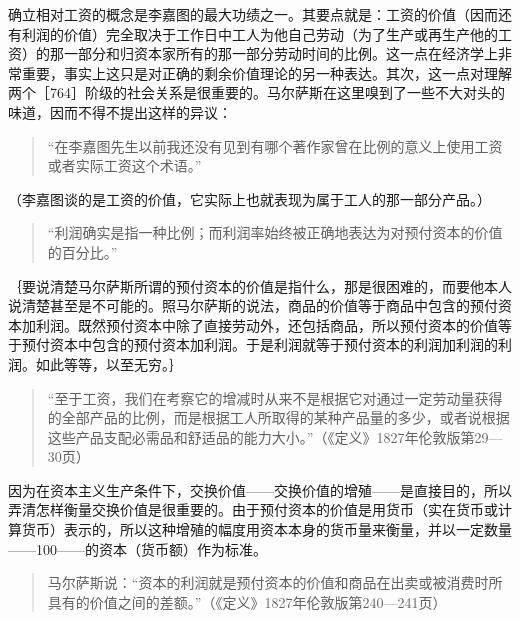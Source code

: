确立相对工资的概念是李嘉图的最大功绩之一。其要点就是：工资的价值（因而还有利润的价值）完全取决于工作日中工人为他自己劳动（为了生产或再生产他的工资）的那一部分和归资本家所有的那一部分劳动时间的比例。这一点在经济学上非常重要，事实上这只是对正确的剩余价值理论的另一种表达。其次，这一点对理解两个［764］阶级的社会关系是很重要的。马尔萨斯在这里嗅到了一些不大对头的味道，因而不得不提出这样的异议：

\begin{quote}{“在李嘉图先生以前我还没有见到有哪个著作家曾在比例的意义上使用工资或者实际工资这个术语。”}\end{quote}

（李嘉图谈的是工资的价值，它实际上也就表现为属于工人的那一部分产品。）

\begin{quote}{“利润确实是指一种比例；而利润率始终被正确地表达为对预付资本的价值的百分比。”}\end{quote}

｛要说清楚马尔萨斯所谓的预付资本的价值是指什么，那是很困难的，而要他本人说清楚甚至是不可能的。照马尔萨斯的说法，商品的价值等于商品中包含的预付资本加利润。既然预付资本中除了直接劳动外，还包括商品，所以预付资本的价值等于预付资本中包含的预付资本加利润。于是利润就等于预付资本的利润加利润的利润。如此等等，以至无穷。｝

\begin{quote}{“至于工资，我们在考察它的增减时从来不是根据它对通过一定劳动量获得的全部产品的比例，而是根据工人所取得的某种产品量的多少，或者说根据这些产品支配必需品和舒适品的能力大小。”（《定义》1827年伦敦版第29—30页）}\end{quote}

因为在资本主义生产条件下，交换价值——交换价值的增殖——是直接目的，所以弄清怎样衡量交换价值是很重要的。由于预付资本的价值是用货币（实在货币或计算货币）表示的，所以这种增殖的幅度用资本本身的货币量来衡量，并以一定数量——100——的资本（货币额）作为标准。

\begin{quote}{马尔萨斯说：“资本的利润就是预付资本的价值和商品在出卖或被消费时所具有的价值之间的差额。”（《定义》1827年伦敦版第240—241页）}\end{quote}



